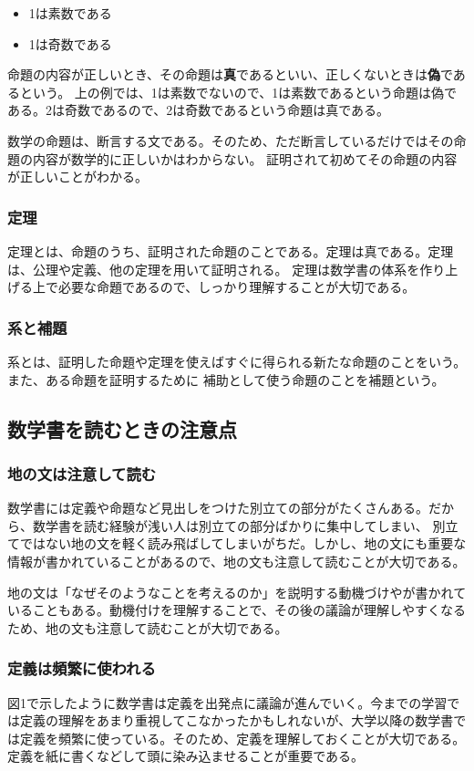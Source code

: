 \documentclass{jlreq}
\begin{document}
\begin{itemize}
    \item 1は素数である
    \item 1は奇数である
\end{itemize}

命題の内容が正しいとき、その命題は\textbf{真}であるといい、正しくないときは\textbf{偽}であるという。
上の例では、1は素数でないので、1は素数であるという命題は偽である。2は奇数であるので、2は奇数であるという命題は真である。

数学の命題は、断言する文である。そのため、ただ断言しているだけではその命題の内容が数学的に正しいかはわからない。
証明されて初めてその命題の内容が正しいことがわかる。

\subsubsection{定理}
定理とは、命題のうち、証明された命題のことである。定理は真である。定理は、公理や定義、他の定理を用いて証明される。
定理は数学書の体系を作り上げる上で必要な命題であるので、しっかり理解することが大切である。

\subsubsection{系と補題}
系とは、証明した命題や定理を使えばすぐに得られる新たな命題のことをいう。また、ある命題を証明するために
補助として使う命題のことを補題という。

\subsection{数学書を読むときの注意点}
\subsubsection{地の文は注意して読む}
数学書には定義や命題など見出しをつけた別立ての部分がたくさんある。だから、数学書を読む経験が浅い人は別立ての部分ばかりに集中してしまい、
別立てではない地の文を軽く読み飛ばしてしまいがちだ。しかし、地の文にも重要な情報が書かれていることがあるので、地の文も注意して読むことが大切である。

地の文は「なぜそのようなことを考えるのか」を説明する動機づけやが書かれていることもある。動機付けを理解することで、その後の議論が理解しやすくなるため、地の文も注意して読むことが大切である。

\subsubsection{定義は頻繁に使われる}
図1で示したように数学書は定義を出発点に議論が進んでいく。今までの学習では定義の理解をあまり重視してこなかったかもしれないが、大学以降の数学書では定義を頻繁に使っている。そのため、定義を理解しておくことが大切である。
定義を紙に書くなどして頭に染み込ませることが重要である。
\end{document}
